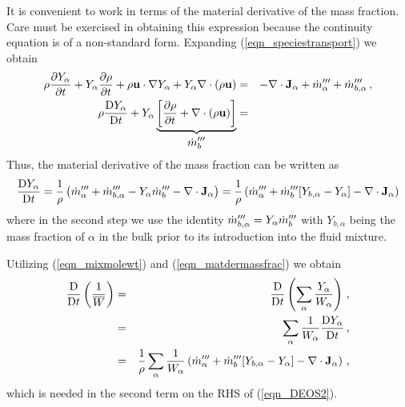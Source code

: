 It is convenient to work in terms of the material derivative of the mass fraction.  Care must be exercised in obtaining this expression because the continuity equation is of a non-standard form.
Expanding (\ref{eqn_speciestransport}) we obtain
\begin{eqnarray}
\label{eqn_speciesexpansion}
\rho\frac{\partial Y_\alpha}{\partial t} + Y_\alpha \frac{\partial \rho}{\partial t} + \rho \mathbf{u}\cdot \nabla Y_\alpha + Y_\alpha \Div \left(\rho \mathbf{u}\right) &=&
- \Div \mathbf{J}_{\alpha} + \dot{m}_\alpha^{\tripleprime} + \dot{m}_{b,\alpha}^{\tripleprime} \,\mbox{,} \nonumber\vspace{0.3cm}\\
\rho \frac{\mbox{D} Y_\alpha}{\mbox{D} t} + Y_\alpha \underbrace{\left[ \frac{\partial \rho}{\partial t} + \Div \left(\rho \mathbf{u}\right) \right]}_{\displaystyle \dot{m}_b^{\tripleprime}} &=& \mbox{}
\end{eqnarray}
Thus, the material derivative of the mass fraction can be written as
\begin{equation}
\label{eqn_matdermassfrac}
\frac{\mbox{D} Y_\alpha}{\mbox{D} t} = \frac{1}{\rho}\left(  \dot{m}_\alpha^{{\prime\prime\prime}} + \dot{m}_{b,\alpha}^{{\prime\prime\prime}} -
Y_\alpha \dot{m}_b^{{\prime\prime\prime}}  - \nabla\cdot \mathbf{J}_{\alpha} \right)
= \frac{1}{\rho}\left(  \dot{m}_\alpha^{{\prime\prime\prime}} + \dot{m}_{b}^{{\prime\prime\prime}}[Y_{b,\alpha} - Y_\alpha] - \nabla\cdot \mathbf{J}_{\alpha} \right)
\end{equation}
where in the second step we use the identity $\dot{m}_{b,\alpha}^{{\prime\prime\prime}} = Y_\alpha \dot{m}_{b}^{{\prime\prime\prime}}$ with $Y_{b,\alpha}$ being the
mass fraction of $\alpha$ in the bulk prior to its introduction into the fluid mixture.

Utilizing (\ref{eqn_mixmolewt}) and (\ref{eqn_matdermassfrac}) we obtain
\begin{eqnarray}
\label{eqn_transportexpression}
\frac{\mbox{D}}{\mbox{D} t}\left(\frac{1}{\overline{W}}\right) &=& \frac{\mbox{D}}{\mbox{D} t}\left(\sum_\alpha \frac{Y_\alpha}{W_\alpha} \right) \,\mbox{,} \nonumber \vspace{0.3cm}\\
&=& \sum_\alpha \frac{1}{W_\alpha} \frac{\mbox{D}Y_\alpha }{\mbox{D} t} \,\mbox{,} \nonumber \vspace{0.3cm}\\
&=& \frac{1}{\rho} \sum_\alpha \frac{1}{W_\alpha} \left(  \dot{m}_\alpha^{\tripleprime} + \dot{m}_{b}^{\tripleprime}[Y_{b,\alpha} - Y_\alpha] - \Div \mathbf{J}_{\alpha} \right)  \,\mbox{,}
\end{eqnarray}
which is needed in the second term on the RHS of (\ref{eqn_DEOS2}).


